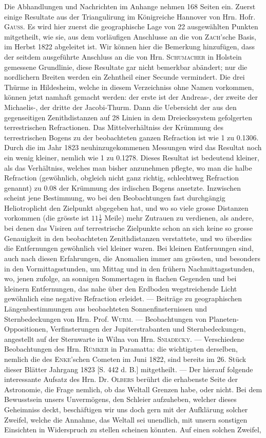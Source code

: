 Die Abhandlungen und Nachrichten im Anhange nehmen 168 Seiten ein. Zuerst einige Resultate aus der Triangulirung im Königreiche Hannover von Hrn. Hofr. \textsc{Gauss}. Es wird hier zuerst die geographische Lage von 22 ausgewählten Punkten mitgetheilt, wie sie, aus dem vorläufigen Anschlusse an die von \textsc{Zach}'sche Basis, im Herbst 1822 abgeleitet ist. Wir können hier die Bemerkung hinzufügen, dass der seitdem ausgeführte Anschluss an die von Hrn. \textsc{Schumacher} in Holstein gemessene Grundlinie, diese Resultate gar nicht bemerkbar abändert; nur die nordlichern Breiten werden ein Zehntheil einer Secunde vermindert. Die drei Thürme in Hildesheim, welche in diesem Verzeichniss ohne Namen vorkommen, können jetzt namhaft gemacht werden: der erste ist der Andreas-, der zweite der Michaelis-, der dritte der Jacobi-Thurm. Dann die Uebersicht der aus den gegenseitigen Zenithdistanzen auf 28 Linien in dem Dreieckssystem gefolgerten terrestrischen Refractionen. Das Mittelverhältniss der Krümmung des terrestrischen Bogens zu der beobachteten ganzen Refraction ist wie 1 zu 0.1306. Durch die im Jahr 1823 neuhinzugekommenen Messungen wird das Resultat noch ein wenig kleiner, nemlich wie 1 zu 0.1278. Dieses Resultat ist bedeutend kleiner, als das Verhältniss, welches man bisher anzunehmen pflegte, wo man die halbe Refraction (gewöhnlich, obgleich nicht ganz richtig, schlechtweg Refraction genannt) zu 0.08 der Krümmung des irdischen Bogens ansetzte. Inzwischen scheint jene Bestimmung, wo bei den Beobachtungen fast durchgängig Heliotroplicht den Zielpunkt abgegeben hat, und wo so viele grosse Distanzen vorkommen (die grösste ist $11\tfrac{1}{2}$ Meile) mehr Zutrauen zu verdienen, als andere, bei denen das Visiren auf terrestrische Zielpunkte schon an sich keine so grosse Genauigkeit in den beobachteten Zenithdistanzen verstattete, und wo überdies die Entfernungen gewöhnlich viel kleiner waren. Bei kleinen Entfernungen sind, auch nach diesen Erfahrungen, die Anomalien immer am grössten, und besonders in den Vormittagsstunden, um Mittag und in den frühern Nachmittagsstunden, wo, jenen zufolge, an sonnigen Sommertagen in flachen Gegenden und bei kleinern Entfernungen, das nahe über den Erdboden wegstreichende Licht gewöhnlich eine negative Refraction erleidet. --- Beiträge zu geographischen Längenbestimmungen aus beobachteten Sonnenfinsternissen und Sternbedeckungen von Hrn. Prof. \textsc{Wurm}. --- Beobachtungen von Planeten-Oppositionen, Verfinsterungen der Jupiterstrabanten und Sternbedeckungen, angestellt auf der Sternwarte in Wilna von Hrn. \textsc{Sniadecky}. --- Verschiedene Beobachtungen des Hrn. \textsc{Rümker} in Paramatta: die wichtigsten derselben, nemlich die des \textsc{Enke}'schen Cometen im Juni 1822, sind bereits im 26. Stück dieser Blätter Jahrgang 1823 [S. 442 d. B.] mitgetheilt. --- Der hierauf folgende interessante Aufsatz des Hrn. Dr. \textsc{Olbers} berührt die erhabenste Seite der Astronomie, die Frage nemlich, ob das Weltall Grenzen habe, oder nicht. Bei dem Bewusstsein unsers Unvermögens, den Schleier aufzuheben, welcher dieses Geheimniss deckt, beschäftigen wir uns doch gern mit der Aufklärung solcher Zweifel, welche die Annahme, das Weltall sei unendlich, mit unsern sonstigen Einsichten in Widerspruch zu stellen scheinen könnten. Auf einen solchen Zweifel, 